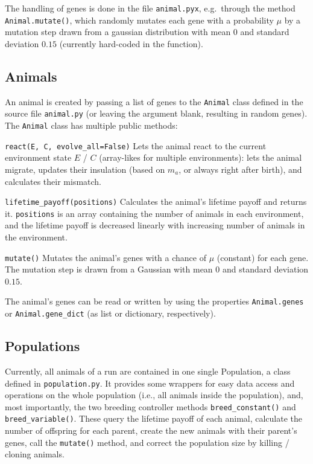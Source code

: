 \documentclass[
12pt, %
a4paper, %
headinclude,footinclude %
]{article}
\newcommand{\modfont}[1]{\begingroup\color{red}#1\endgroup}
\begin{document}
\noindent The handling of genes is done in the file \verb|animal.pyx|, e.g.~through the method \\ \verb+Animal.mutate()+, which randomly mutates each gene with a probability $\mu$ by a mutation step drawn from a gaussian distribution with mean $0$ and standard deviation $0.15$ (currently hard-coded in the function).

\subsection{Animals}
An animal is created by passing a list of genes to the \verb+Animal+ class defined in the source file \verb+animal.py+ (or leaving the argument blank, resulting in random genes). The \verb+Animal+ class has multiple public methods:

\begin{description}
\item{\verb+react(E, C, evolve_all=False)+} Lets the animal react to the current environment state $E$ / $C$ (\modfont{array-likes for multiple environments}): \modfont{lets the animal migrate}, updates their insulation (based on $m_a$, or always right after birth), and calculates their mismatch.
\item{\verb+lifetime_payoff(positions)+} Calculates the animal's lifetime payoff and returns it. \cprotect\modfont{\verb+positions+ is an array containing the number of animals in each environment, and the lifetime payoff is decreased linearly with increasing number of animals in the environment.}
\item{\verb+mutate()+} Mutates the animal's genes with a chance of $\mu$ (constant) for each gene. The mutation step is drawn from a Gaussian with mean $0$ and standard deviation $0.15$.
\end{description}

\noindent The animal's genes can be read or written by using the properties \verb|Animal.genes| or \verb|Animal.gene_dict| (as list or dictionary, respectively).

\subsection{Populations}
Currently, all animals of a run are contained in one single Population, a class defined in \verb|population.py|. It provides some wrappers for easy data access and operations on the whole population (i.e., all animals inside the population), and, most importantly, the two breeding controller methods  \verb|breed_constant()| and \verb|breed_variable()|. These query the lifetime payoff of each animal, calculate the number of offspring for each parent, create the new animals with their parent's genes, call the \verb|mutate()| method, and correct the population size by killing / cloning animals.
\end{document}
